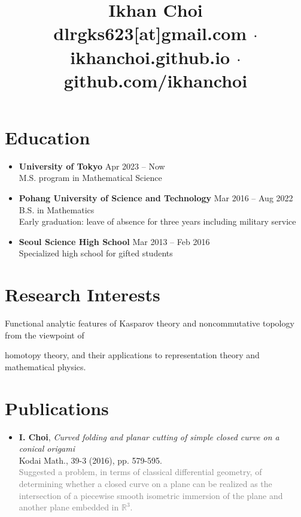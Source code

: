 \documentclass[11pt,a4paper]{article}
\title{\vspace{-40pt}
	Ikhan Choi\\[5pt]
	\small \faEnvelopeSquare\quad dlrgks623[at]gmail.com
	\quad$\cdot$\quad \faHome\quad ikhanchoi.github.io
	\quad$\cdot$\quad \faGithub\quad github.com/ikhanchoi
	\vspace{-5em}}
\date{}
\begin{document}
\maketitle


\section*{Education}
\begin{itemize}
\item
	\textbf{University of Tokyo}
	\hfill{\small Apr 2023 -- Now}\\
	M.S. program in Mathematical Science
\item
	\textbf{Pohang University of Science and Technology}
	\hfill{\small Mar 2016 -- Aug 2022}\\
	B.S. in Mathematics\\
	Early graduation: leave of absence for three years including military service
\item
	\textbf{Seoul Science High School}
	\hfill{\small Mar 2013 -- Feb 2016}\\
	Specialized high school for gifted students
\end{itemize}



\section*{Research Interests}
\hspace{2em}
Functional analytic features of Kasparov theory and noncommutative topology from the viewpoint of\par
\hspace{2em}
homotopy theory, and their applications to representation theory and mathematical physics.



\section*{Publications}
\begin{itemize}
\item
	\textbf{I. Choi},
	\emph{Curved folding and planar cutting of simple closed curve on a conical origami}\\
	Kodai Math., 39-3 (2016), pp. 579-595.\\
	\textcolor{gray}{Suggested a problem, in terms of classical differential geometry, of determining whether a closed curve on a plane can be realized as the intersection of a piecewise smooth isometric immersion of the plane and another plane embedded in $\mathbb{R}^3$.}
\end{itemize}
\end{document}
